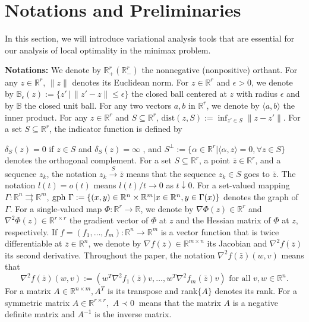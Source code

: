 \documentclass[11pt]{article}
\numberwithin{equation}{section}
\begin{document}
\section{Notations and Preliminaries}\label{4.2}
In this section, we will introduce variational analysis tools that are essential for our analysis of local optimality in the minimax problem.

{\bf Notations:} We denote by $\mathbb{R}_+^r (\mathbb{R}_-^r)$ the nonnegative (nonpositive) orthant. For any $z \in \mathbb{R}^r$, $\|z\|$ denotes its Euclidean norm. For $z \in \mathbb{R}^r$ and $\epsilon>0$, we denote by $\mathbb{B}_\epsilon(z):=\{z' \,| \,\|z'-z\|\leq \epsilon\}$ the closed ball centered at $z$ with radius $\epsilon$ and by $\mathbb{B}$ the closed unit ball. For any two vectors $a, b$ in $\mathbb{R}^r$, we denote by $\langle a, b\rangle$ the inner product. For any $z \in \mathbb{R}^r$ and $S \subseteq \mathbb{R}^r$, $\mathrm{dist}(z,S):=\inf_{z'\in S}\|z-z'\|$. For a set $S \subseteq \mathbb{R}^r$,  the indicator function is defined by {$\delta_S( z)= 0 $  { if }  $z \in S$ and $\delta_S( z)= \infty $ ,  and $S^{\perp}:=\{\alpha \in \mathbb{R}^r | \langle \alpha, z\rangle=0, \forall z \in S\}$ denotes the orthogonal complement. For a set  $S\subseteq \mathbb{R}^r$, a point $\bar z \in \mathbb{R}^r$, and a sequence $z_k$, the notation $z_k \stackrel{S}{\rightarrow} \bar{z}$ means that the sequence $z_k\in S$ goes to $\bar z$. The notation $l(t) = o(t)$ means $l(t)/t \to 0$ as $ t \downarrow 0$. For a set-valued mapping $\Gamma: \mathbb{R}^n \rightrightarrows \mathbb{R}^m$, ${\rm gph\ }\Gamma:=\{(x,y) \in \mathbb{R}^n \times \mathbb{R}^m | x \in \mathbb{R}^n, y\in \Gamma(x)\}$ denotes the graph of $\Gamma$.  For a single-valued map $\Phi: \mathbb{R}^r \rightarrow \mathbb{R}$, we denote by $\nabla \Phi(z) \in \mathbb{R}^{r}$ and $\nabla^2 \Phi(z) \in \mathbb{R}^{r \times r}$ the gradient vector of $\Phi$ at $z$ and the Hessian matrix of $\Phi$ at $z$, respectively. {If $ f=(f_1,\dots, f_m): \mathbb{R}^n \rightarrow \mathbb{R}^m$ is a vector function that is twice differentiable at $\bar z \in \mathbb{R}^n$,  we denote by $\nabla f(\bar z) \in \mathbb{R}^{m\times n}$ its Jacobian and $\nabla^2 f(\bar z)$ its second derivative. Throughout the paper, the notation $\nabla^2 f(\bar z)(w,v)$ means that
		$$\nabla^2 f(\bar z)(w,v):=(w^T\nabla^2 f_1(\bar z)v, \dots, w^T \nabla^2 f_m(\bar z)v) \mbox{ for all } v, w \in \mathbb{R}^n. $$  } For a matrix $A \in \mathbb{R}^{n \times m}, A^T$ is its transpose and rank$\{A\}$ denotes its rank. For a symmetric matrix $A \in \mathbb{R}^{r \times r},$ $A\prec 0\ $ means that the matrix $A$ is a negative definite matrix and $A^{-1}$ is the inverse matrix.

}
\end{document}
